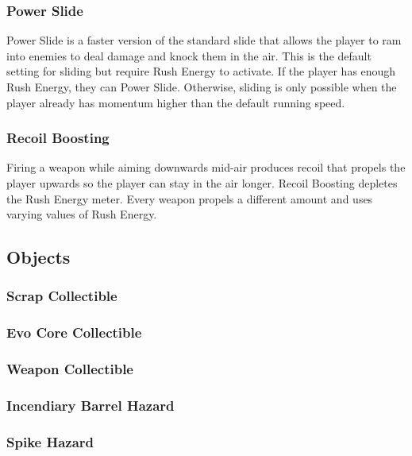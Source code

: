 \documentclass[12pt]{article}
\begin{document}
\subsubsection{Power Slide}

Power Slide is a faster version of the standard slide that allows the player to ram into enemies to deal damage and knock them in the air. This is the default setting for sliding but require Rush Energy to activate. If the player has enough Rush Energy, they can Power Slide. Otherwise, sliding is only possible when the player already has momentum higher than the default running speed. 

\subsubsection{Recoil Boosting}

Firing a weapon while aiming downwards mid-air produces recoil that propels the player upwards so the player can stay in the air longer. Recoil Boosting depletes the Rush Energy meter. Every weapon propels a different amount and uses varying values of Rush Energy. 

\subsection{Objects}

\subsubsection{Scrap Collectible}

\subsubsection{Evo Core Collectible}

\subsubsection{Weapon Collectible}

\subsubsection{Incendiary Barrel Hazard}

\subsubsection{Spike Hazard}
\end{document}
